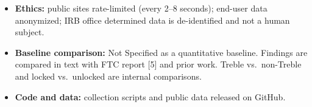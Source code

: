 \documentclass[11pt,a4paper]{article}
\begin{document}
\begin{enumerate}
\begin{itemize}[leftmargin=*, itemsep=1pt, topsep=2pt]
\begin{itemize}[itemsep=0pt]
            \item Manual validation of programmatically collected carrier fields.
            \item Gap sensitivity check: repeat without post-gap builds; first 5 vs.\ last 5 months.
            \item Ground truth for actual device patch level: Not Specified (build number used as proxy).
        \end{itemize}
        \item \textbf{Ethics:} public sites rate-limited (every 2--8 seconds); end-user data anonymized; IRB office determined data is de-identified and not a human subject.
        \item \textbf{Baseline comparison:} Not Specified as a quantitative baseline. Findings are compared in text with FTC report [5] and prior work. Treble vs.\ non-Treble and locked vs.\ unlocked are internal comparisons.
        \item \textbf{Code and data:} collection scripts and public data released on GitHub.
    \end{itemize}


\end{enumerate}
\end{document}
